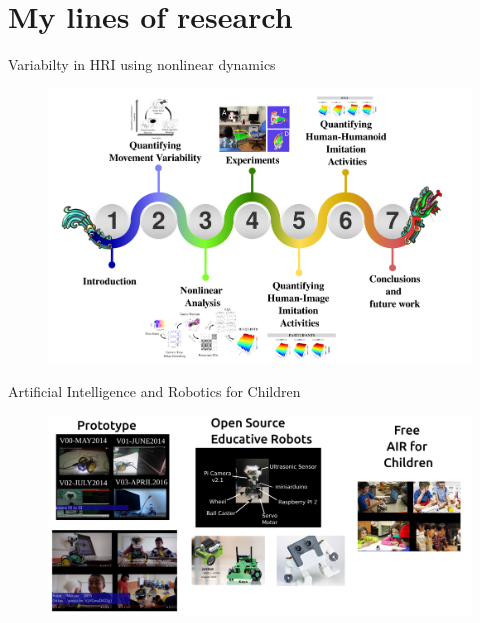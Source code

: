 
\section{My lines of research}
{
\begin{frame}{Variabilty in HRI using nonlinear dynamics}
    \vspace{-00mm}
      \begin{figure}
        \centering
        \includegraphics[width=0.8\linewidth]{./figs/oa-thesis/versions/drawing-v00.png}
        \caption{}
      \end{figure}
\end{frame}
}

{
\begin{frame}{Artificial Intelligence and Robotics for Children}
    \vspace{-00mm}
      \begin{figure}
        \centering
        \includegraphics[width=0.8\linewidth]{./figs/air4children/versions/drawing-v00.png}
        \caption{}
      \end{figure}
\end{frame}
}

